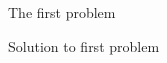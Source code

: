 \documentclass{mathhomework}
\begin{document}
    \maketitle

    \pagebreak

    \begin{problem}
        The first problem

        \begin{solution}
            Solution to first problem
        \end{solution}
    \end{problem}
\end{document}
